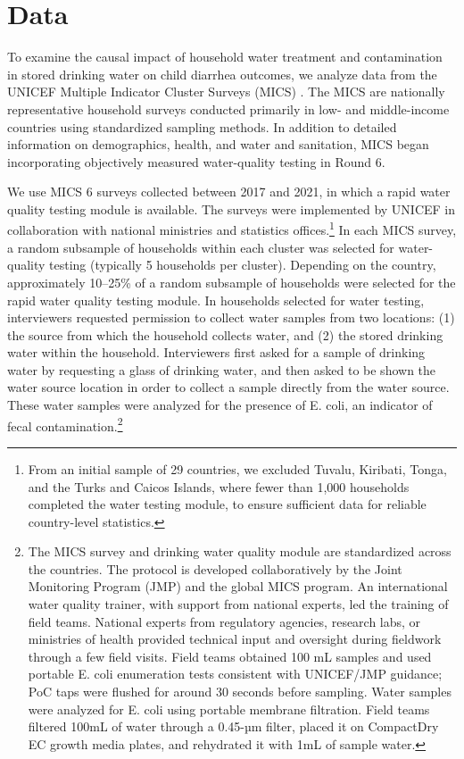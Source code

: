 \documentclass [11pt]{article}
\theoremstyle{plain}
\theoremstyle{definition}
\theoremstyle{remark}
\newcommand{\1}{\bm{1}}
\begin{document}
\section{Data}
To examine the causal impact of household water treatment and contamination in stored drinking water on child diarrhea outcomes, we analyze data from the UNICEF Multiple Indicator Cluster Surveys (MICS) \citep{mics_ecoli}. The MICS are nationally representative household surveys conducted primarily in low- and middle-income countries using standardized sampling methods. In addition to detailed information on demographics, health, and water and sanitation, MICS began incorporating objectively measured water-quality testing in Round 6.

We use MICS 6 surveys collected between 2017 and 2021, in which a rapid water quality testing module is available. The surveys were implemented by UNICEF in collaboration with national ministries and statistics offices.\footnote{From an initial sample of 29 countries, we excluded Tuvalu, Kiribati, Tonga, and the Turks and Caicos Islands, where fewer than 1,000 households completed the water testing module, to ensure sufficient data for reliable country-level statistics.} In each MICS survey, a random subsample of households within each cluster was selected for water-quality testing (typically 5 households per cluster). Depending on the country, approximately 10–25\% of a random subsample of households were selected for the rapid water quality testing module. In households selected for water testing, interviewers requested permission to collect water samples from two locations: (1) the source from which the household collects water, and (2) the stored drinking water within the household. Interviewers first asked for a sample of drinking water by requesting a glass of drinking water, and then asked to be shown the water source location in order to collect a sample directly from the water source. These water samples were analyzed for the presence of E. coli, an indicator of fecal contamination.\footnote{The MICS survey and drinking water quality module are standardized across the countries. The protocol is developed collaboratively by the Joint Monitoring Program (JMP) and the global MICS program. An international water quality trainer, with support from national experts, led the training of field teams. National experts from regulatory agencies, research labs, or ministries of health provided technical input and oversight during fieldwork through a few field visits. Field teams obtained 100 mL samples and used portable E. coli enumeration tests consistent with UNICEF/JMP guidance; PoC taps were flushed for around 30 seconds before sampling. Water samples were analyzed for E. coli using portable membrane filtration. Field teams filtered 100mL of water through a 0.45-µm filter, placed it on CompactDry EC growth media plates, and rehydrated it with 1mL of sample water.}
\end{document}
